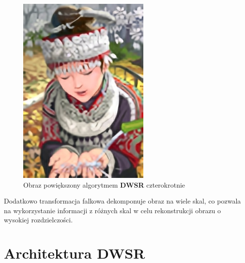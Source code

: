 \begin{figure}[ht]
\begin{minipage}[t]{0.35\linewidth}
        \includegraphics[width=\linewidth]{Rozdziały/02.Podstawy_teoretyczne/Obrazy/comic_DWSR_x4.png}
        \caption{Obraz powiększony algorytmem \textbf{DWSR} czterokrotnie}
        \label{fig:image47}
    \end{minipage}
\end{figure}

Dodatkowo transformacja falkowa dekomponuje obraz na wiele skal, co pozwala na wykorzystanie informacji z różnych skal w celu rekonstrukcji obrazu o wysokiej rozdzielczości. 


\section{Architektura DWSR}

